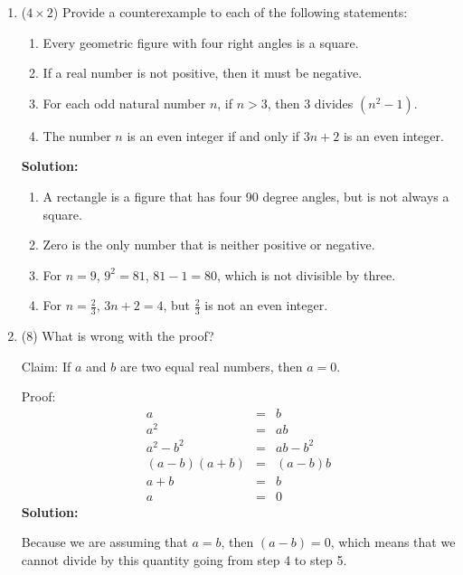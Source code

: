\documentclass[12pt]{article}
\begin{document}
\begin{enumerate}

	\item ($4 \times 2$)
		Provide a counterexample to each of the following statements:
	\begin{enumerate}
		\item
		Every geometric figure with four right angles is a square.
		\item
		If a real number is not positive, then it must be negative.
		\item
	   For each odd natural number $n$, if $n>3$, then 3 divides $(n^2-1)$.
		\item
		The number $n$ is an even integer if and only if $3n+2$ is an even integer.
	\end{enumerate}
	{\bf Solution:}
	\begin{enumerate}
		\item A rectangle is a figure that has four 90 degree angles, but is not always a square.
		\item Zero is the only number that is neither positive or negative.
		\item For $n = 9$, $9^2 = 81$, $81 - 1 = 80$, which is not divisible by three.
		\item For $n = \frac{2}{3}$, $3n + 2 = 4$, but $\frac{2}{3}$ is not an even integer.
	\end{enumerate}


	\newpage

	\item (8)
	What is wrong with the proof?

	Claim: If $a$ and $b$ are two equal real numbers, then $a = 0$.

	Proof:
	\begin{eqnarray}
	a &=& b \\
	a^2 &=& ab \\
	a^2 - b^2 &=& ab - b^2	\\
	(a-b)(a+b) &=& (a-b)b \\
	a + b &=& b \\
	a &=& 0
	\end{eqnarray}
	{\bf Solution:}

	Because we are assuming that $a = b$, then $(a - b) = 0$, which means that we cannot divide by this quantity going from step 4 to step 5.


\end{enumerate}
\end{document}
